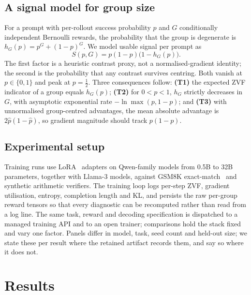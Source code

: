 \subsection{A signal model for group size}
For a prompt with per-rollout success probability $p$ and $G$
conditionally independent Bernoulli rewards, the probability that the group
is degenerate is $h_G(p) = p^G + (1-p)^G$. We model usable signal per
prompt as
\begin{equation}
S(p,G) = p(1-p)\bigl(1 - h_G(p)\bigr).
\label{eq:signal}
\end{equation}
The first factor is a heuristic contrast proxy, not a normalised-gradient identity; the second
is the probability that any contrast survives centring. Both vanish at
$p \in \{0,1\}$ and peak at $p = \tfrac12$. Three consequences follow:
\textbf{(T1)} the expected ZVF indicator of a group equals $h_G(p)$;
\textbf{(T2)} for $0<p<1$, $h_G$ strictly decreases in $G$, with asymptotic exponential rate
$-\ln\max(p,1-p)$; and \textbf{(T3)} with unnormalised group-centred
advantages, the mean absolute advantage is $2\hat p(1-\hat p)$, so gradient
magnitude should track $p(1-p)$.

\subsection{Experimental setup}
Training runs use LoRA~\cite{hu2022lora} adapters on Qwen-family models
from 0.5B to 32B parameters, together with Llama-3 models, against GSM8K
exact-match~\cite{cobbe2021training} and synthetic arithmetic verifiers. The
training loop logs per-step ZVF, gradient utilisation, entropy, completion
length and KL, and persists the raw per-group reward tensors so that every
diagnostic can be recomputed rather than read from a log line. The same
task, reward and decoding specification is dispatched to a managed training
API and to an open trainer; comparisons hold the stack fixed and vary one
factor. Panels differ in model, task, seed count and held-out size; we
state these per result where the retained artifact records them, and say so
where it does not.

\section{Results}

